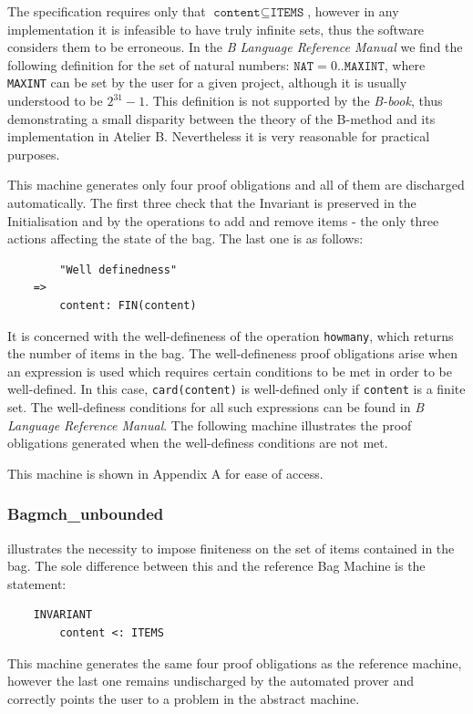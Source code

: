 \documentclass[11pt,journal]{IEEEtran}
\begin{document}
	The specification requires only that $\texttt{content} \subseteq \texttt{ITEMS}$, however in any implementation it is infeasible to have truly infinite sets, thus the software considers them to be erroneous. In the \emph{B Language Reference Manual}\cite{b reference} we find the following definition for the set of natural numbers: ${\texttt{NAT}  = 0 .. \texttt{MAXINT}}$, where \texttt{MAXINT} can be set by the user for a given project, although it is usually understood to be $2^{31}-1$. This definition is not supported by the \emph{B-book}, thus demonstrating a small disparity between the theory of the B-method and its implementation in Atelier B. Nevertheless it is very reasonable for practical purposes.
	
	This machine generates only four proof obligations and all of them are discharged automatically. The first three check that the Invariant is preserved in the Initialisation and by the operations to add and remove items - the only three actions affecting the state of the bag. The last one is as follows:
	
	\begin{lstlisting}
		"Well definedness" 
	=> 
		content: FIN(content)
	\end{lstlisting}
	
	It is concerned with the well-defineness of the operation \texttt{howmany}, which returns the number of items in the bag. The well-defineness proof obligations arise when an expression is used which requires certain conditions to be met in order to be well-defined. In this case, \texttt{card(content)} is well-defined only if \texttt{content} is a finite set. The well-definess conditions for all such expressions can be found in \emph{B Language Reference Manual}\cite{b reference}. The following machine illustrates the proof obligations generated when the well-definess conditions are not met.
	
	This machine is shown in Appendix A for ease of access.
	
	\subsubsection{Bagmch\_unbounded} illustrates the necessity to impose finiteness on the set of items contained in the bag. The sole difference between this and the reference Bag Machine is the statement:
	
	\begin{lstlisting}
	INVARIANT
		content <: ITEMS
	\end{lstlisting}
	This machine generates the same four proof obligations as the reference machine, however the last one remains undischarged by the automated prover and correctly points the user to a problem in the abstract machine.
\end{document}
